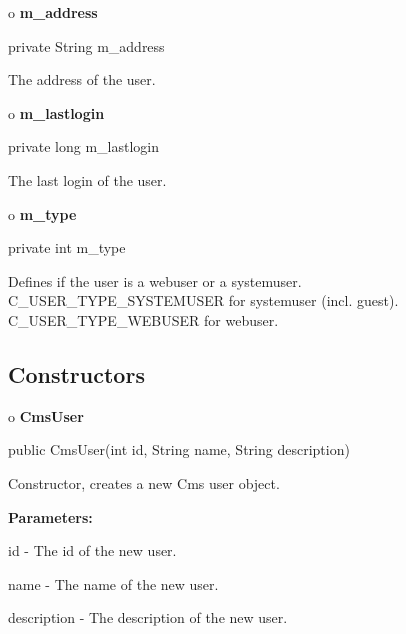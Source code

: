 o {\bf m\_address} 

\begin{PRE}
 private String m\_address
\end{PRE}

\begin{description}
\htmlDD The address of the user.

\end{description}

o {\bf m\_lastlogin} 

\begin{PRE}
 private long m\_lastlogin
\end{PRE}

\begin{description}
\htmlDD The last login of the user.

\end{description}

o {\bf m\_type} 

\begin{PRE}
 private int m\_type
\end{PRE}

\begin{description}
\htmlDD Defines if the user is a webuser or a systemuser.
C\_USER\_TYPE\_SYSTEMUSER for systemuser (incl. guest). C\_USER\_TYPE\_WEBUSER
for webuser.

\end{description}

\subsection*{  Constructors }

o {\bf CmsUser} 

\begin{PRE}
 public CmsUser(int id,
                String name,
                String description)
\end{PRE}

\begin{description}
\htmlDD Constructor, creates a new Cms user object. 

\begin{description}
\item {\bf Parameters:}  

id - The id of the new user.  

name - The name of the new user.  

description - The description of the new user.  
\end{description}

\end{description}

